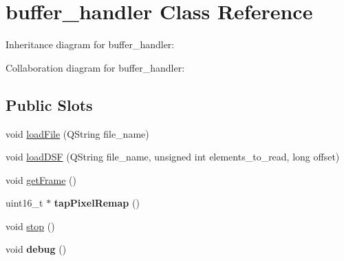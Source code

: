 \hypertarget{classbuffer__handler}{\section{buffer\+\_\+handler Class Reference}
\label{classbuffer__handler}
}


Inheritance diagram for buffer\+\_\+handler\+:


Collaboration diagram for buffer\+\_\+handler\+:
\subsection*{Public Slots}
\begin{DoxyCompactItemize}
\item 
void \hyperlink{classbuffer__handler_ac97c1ebcbff716e0d5467f7ad77f4915}{load\+File} (Q\+String file\+\_\+name)
\item 
void \hyperlink{classbuffer__handler_abcbc11a150d139947d26120a1fa57c2c}{load\+D\+S\+F} (Q\+String file\+\_\+name, unsigned int elements\+\_\+to\+\_\+read, long offset)
\item 
void \hyperlink{classbuffer__handler_a1412418c0a320346f610a8853be22ec4}{get\+Frame} ()
\item 
\hypertarget{classbuffer__handler_a7ab8efaad9af8428fd9b1a83ffe84641}{uint16\+\_\+t $\ast$ {\bfseries tap\+Pixel\+Remap} ()}\label{classbuffer__handler_a7ab8efaad9af8428fd9b1a83ffe84641}

\item 
void \hyperlink{classbuffer__handler_ac6b3633ed160c4579fb18f1424def852}{stop} ()
\item 
\hypertarget{classbuffer__handler_aeb21354e643369851e723df4488ce4c4}{void {\bfseries debug} ()}\label{classbuffer__handler_aeb21354e643369851e723df4488ce4c4}

\end{DoxyCompactItemize}
